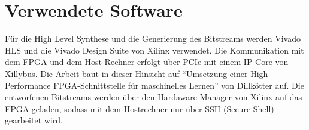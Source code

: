\section{Verwendete Software}
Für die High Level Synthese und die Generierung des Bitstreams werden Vivado HLS  und die Vivado Design Suite von Xilinx verwendet. Die Kommunikation mit dem FPGA und dem Host-Rechner erfolgt über PCIe mit einem IP-Core von Xillybus.\cite{XILLY} Die Arbeit baut in dieser Hinsicht auf "`Umsetzung einer High-Performance FPGA-Schnittstelle für maschinelles Lernen"' von Dillkötter\cite{DILL} auf. Die entworfenen Bitstreams werden über den Hardaware-Manager von Xilinx auf das FPGA geladen, sodass mit dem Hostrechner nur über SSH (Secure Shell) gearbeitet wird.
